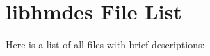 \section{libhmdes File List}
Here is a list of all files with brief descriptions:\begin{CompactList}
\item{}
\item{}
\item{}
\end{CompactList}
